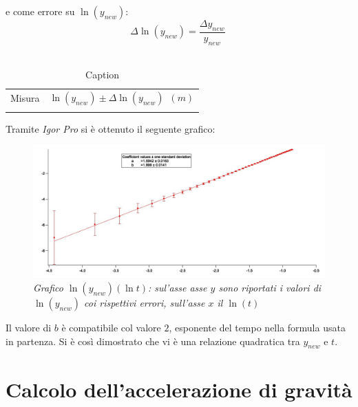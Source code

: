 \documentclass[12pt, a4paper]{article}
\begin{document}
e come errore su $\ln({y_{new}})$: 
\begin{equation*}
    \Delta\ln{(y_{new})}=\frac{\Delta y_{new}}{y_{new}}\ 
\end{equation*}\\

\begin{table}[!h]
    \centering
    \begin{tabular}{|c|c|}
    \hline
    \multirow{2}{*}{\small Misura} 
    &\multirow{2}{*}{\small$\ln({y_{new}}) \pm\Delta\ln{(y_{new})}$\ $(m)$} 
     
    \\
    & 
    \\
    \hline
    \hline
       &   \\
    \hline
    \end{tabular}
        \caption{Caption}
        \label{tab:logaritmi con errore}
\end{table}

\bigskip


 Tramite \textit{Igor Pro} si è ottenuto il seguente grafico:\\
   \begin{figure}[h!]
\centering
\includegraphics[width=170mm]{Immagini/GraphLn.jpg}
\caption{\textit{{\footnotesize{Grafico $\ln{(y_{new})}(\ln{t})$: sul'asse asse $y$ sono riportati i valori di $\ln{(y_{new})}$ coi rispettivi errori, sull'asse $x$ il $\ln{(t)}$}}}}
\label{Grafico logaritmico}
\end{figure}



Il valore di $b$ è compatibile col valore $2$, esponente del tempo nella formula usata in partenza.  Si è così dimostrato che vi è una relazione quadratica tra $y_{new}$ e $t$.



\section{Calcolo dell'accelerazione di gravità}
\end{document}
